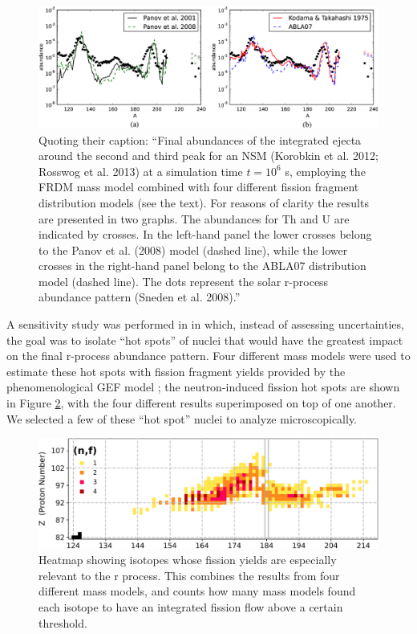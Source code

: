 \begin{figure}
	\centering
	\includegraphics[width=0.9\linewidth]{TeX_files/rProc_abundances}
	\caption[Final r-process abundances for a neutron star merger scenario with different fission fragment distributions.]{Quoting their caption: ``Final abundances of the integrated ejecta around the second and third peak for an NSM (Korobkin et al. 2012; Rosswog et al. 2013) at a simulation time $t={10}^{6}$ s, employing the FRDM mass model combined with four different fission fragment distribution models (see the text). For reasons of clarity the results are presented in two graphs. The abundances for Th and U are indicated by crosses. In the left-hand panel the lower crosses belong to the Panov et al. (2008) model (dashed line), while the lower crosses in the right-hand panel belong to the ABLA07 distribution model (dashed line). The dots represent the solar r-process abundance pattern (Sneden et al. 2008).'' \cite{Eichler2015}}
	\label{fig:rprocabundances}
\end{figure}

A sensitivity study was performed in \cite{Vassh2018} in which, instead of assessing uncertainties, the goal was to isolate ``hot spots'' of nuclei that would have the greatest impact on the final r-process abundance pattern. Four different mass models were used to estimate these hot spots with fission fragment yields provided by the phenomenological GEF model \cite{Schmidt2016}; the neutron-induced fission hot spots are shown in Figure \ref{fig:rprocimportant-fissions}, with the four different results superimposed on top of one another. We selected a few of these ``hot spot'' nuclei to analyze microscopically.

\begin{figure}
	\centering
	\includegraphics[width=0.7\linewidth]{TeX_files/rProc_important-fissions}
	\caption[Isotopes whose fission yields are especially relevant to the r process]{Heatmap showing isotopes whose fission yields are especially relevant to the r process. This combines the results from four different mass models, and counts how many mass models found each isotope to have an integrated fission flow above a certain threshold. \cite{Vassh2018}}
	\label{fig:rprocimportant-fissions}
\end{figure}

